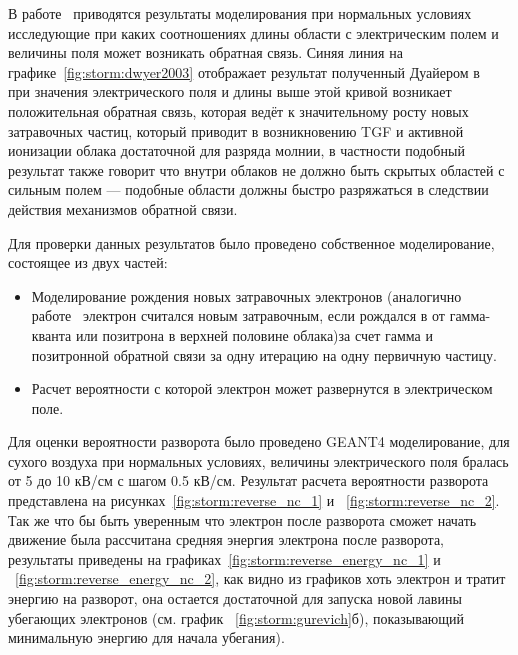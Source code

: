 В работе~\cite{dwyer2003fundamental} приводятся результаты моделирования при нормальных условиях исследующие при каких соотношениях длины области с электрическим полем и величины поля может возникать обратная связь. Синяя линия на графике~\ref{fig:storm:dwyer2003} отображает результат полученный Дуайером в ~\cite{dwyer2003fundamental} при значения электрического поля и длины выше этой кривой возникает положительная обратная связь, которая ведёт к значительному росту новых затравочных частиц, который приводит в возникновению TGF и активной ионизации облака достаточной для разряда молнии, в частности подобный результат также говорит что внутри облаков не должно быть скрытых областей с сильным полем --- подобные области должны быстро разряжаться в следствии действия механизмов обратной связи.

Для проверки данных результатов было проведено собственное моделирование, состоящее из двух частей:
\begin{itemize}
	\item Моделирование рождения новых затравочных электронов (аналогично работе~\cite{dwyer2003fundamental} электрон считался новым затравочным, если рождался в от гамма-кванта или позитрона в верхней половине облака)за счет гамма и позитронной обратной связи за одну итерацию на одну первичную частицу.
	\item Расчет вероятности с которой электрон может развернутся в электрическом поле. 
\end{itemize}
Для оценки вероятности разворота было проведено GEANT4 моделирование, для сухого воздуха при нормальных условиях, величины электрического поля бралась от 5 до 10 кВ/см с шагом 0.5 кВ/см. Результат расчета вероятности разворота представлена на рисунках~\ref{fig:storm:reverse_nc_1} и ~\ref{fig:storm:reverse_nc_2}. Так же что бы быть уверенным что электрон после разворота сможет начать движение была рассчитана средняя энергия электрона после разворота, результаты приведены на графиках~\ref{fig:storm:reverse_energy_nc_1} и ~\ref{fig:storm:reverse_energy_nc_2}, как видно из графиков хоть электрон и тратит энергию на разворот, она остается достаточной для запуска новой лавины убегающих электронов (см. график ~\ref{fig:storm:gurevich}б), показывающий минимальную энергию для начала убегания).  

